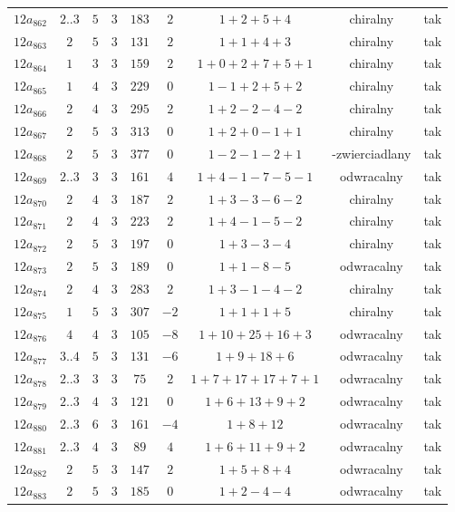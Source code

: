 \begin{longtable}{ccccccccc}
$12a_{862}$ & $2..3$ & $5$ & $3$ & $183$ & $2$ & $1+2+5+4$ & chiralny & tak \\
$12a_{863}$ & $2$ & $5$ & $3$ & $131$ & $2$ & $1+1+4+3$ & chiralny & tak \\
$12a_{864}$ & $1$ & $3$ & $3$ & $159$ & $2$ & $1+0+2+7+5+1$ & chiralny & tak \\
$12a_{865}$ & $1$ & $4$ & $3$ & $229$ & $0$ & $1-1+2+5+2$ & chiralny & tak \\
$12a_{866}$ & $2$ & $4$ & $3$ & $295$ & $2$ & $1+2-2-4-2$ & chiralny & tak \\
$12a_{867}$ & $2$ & $5$ & $3$ & $313$ & $0$ & $1+2+0-1+1$ & chiralny & tak \\
$12a_{868}$ & $2$ & $5$ & $3$ & $377$ & $0$ & $1-2-1-2+1$ & -zwierciadlany & tak \\
$12a_{869}$ & $2..3$ & $3$ & $3$ & $161$ & $4$ & $1+4-1-7-5-1$ & odwracalny & tak \\
$12a_{870}$ & $2$ & $4$ & $3$ & $187$ & $2$ & $1+3-3-6-2$ & chiralny & tak \\
$12a_{871}$ & $2$ & $4$ & $3$ & $223$ & $2$ & $1+4-1-5-2$ & chiralny & tak \\
$12a_{872}$ & $2$ & $5$ & $3$ & $197$ & $0$ & $1+3-3-4$ & chiralny & tak \\
$12a_{873}$ & $2$ & $5$ & $3$ & $189$ & $0$ & $1+1-8-5$ & odwracalny & tak \\
$12a_{874}$ & $2$ & $4$ & $3$ & $283$ & $2$ & $1+3-1-4-2$ & chiralny & tak \\
$12a_{875}$ & $1$ & $5$ & $3$ & $307$ & $-2$ & $1+1+1+5$ & chiralny & tak \\
$12a_{876}$ & $4$ & $4$ & $3$ & $105$ & $-8$ & $1+10+25+16+3$ & odwracalny & tak \\
$12a_{877}$ & $3..4$ & $5$ & $3$ & $131$ & $-6$ & $1+9+18+6$ & odwracalny & tak \\
$12a_{878}$ & $2..3$ & $3$ & $3$ & $75$ & $2$ & $1+7+17+17+7+1$ & odwracalny & tak \\
$12a_{879}$ & $2..3$ & $4$ & $3$ & $121$ & $0$ & $1+6+13+9+2$ & odwracalny & tak \\
$12a_{880}$ & $2..3$ & $6$ & $3$ & $161$ & $-4$ & $1+8+12$ & odwracalny & tak \\
$12a_{881}$ & $2..3$ & $4$ & $3$ & $89$ & $4$ & $1+6+11+9+2$ & odwracalny & tak \\
$12a_{882}$ & $2$ & $5$ & $3$ & $147$ & $2$ & $1+5+8+4$ & odwracalny & tak \\
$12a_{883}$ & $2$ & $5$ & $3$ & $185$ & $0$ & $1+2-4-4$ & odwracalny & tak \\

\end{longtable}
